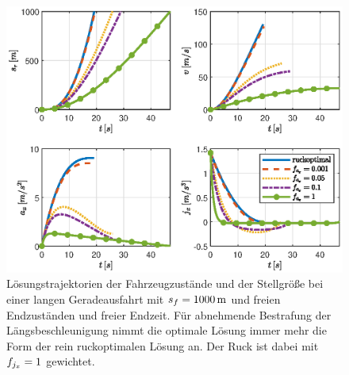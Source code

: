 \begin{figure}[h] 
	\centering
	\includegraphics[width=0.8\linewidth]{./Bilder/Ergebnisse/Geradeausfahrt/var_fax.eps}
	\caption{Lösungstrajektorien der Fahrzeugzustände und der Stellgröße bei einer langen Geradeausfahrt mit $s_f=1000\,\mathrm{m}$ und freien Endzuständen und freier Endzeit. Für abnehmende Bestrafung der Längsbeschleunigung nimmt die optimale Lösung immer mehr die Form der rein ruckoptimalen Lösung an. Der Ruck ist dabei mit $f_{j_x} = 1$ gewichtet.}
	\label{fig:var_fax}
\end{figure}

